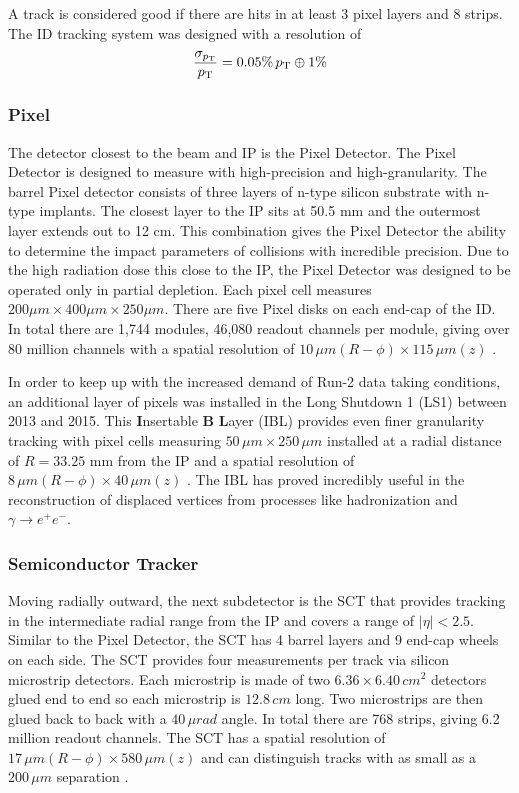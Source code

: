 		A track is considered good if there are hits in at least 3 pixel layers and 8 strips. The ID tracking system was designed with a resolution of 
		\begin{equation}\label{eqn:tracking-resolution}
		\frac{\sigma_{p_{\text{T}}}}{p_{\text{T}}} = 0.05 \% \, p_{\text{T}} \oplus 1\%
		\end{equation}
	
		\subsubsection{Pixel}\label{sssec:pixel}
		The detector closest to the beam and IP is the Pixel Detector. The Pixel Detector is designed to measure with high-precision and high-granularity. The barrel Pixel detector consists of three layers of n-type silicon substrate with n-type implants. The closest layer to the IP sits at 50.5 mm and the outermost layer extends out to 12 cm. This combination gives the Pixel Detector the ability to determine the impact parameters of collisions with incredible precision. Due to the high radiation dose this close to the IP, the Pixel Detector was designed to be operated only in partial depletion. Each pixel cell measures $200 \mu m \times 400 \mu m \times 250 \mu m$. There are five Pixel disks on each end-cap of the ID. In total there are 1,744 modules, 46,080 readout channels per module, giving over 80 million channels with a spatial resolution of $10 \, \mu m (R-\phi) \times 115 \, \mu m (z)$ \cite{ATLAS-pixel}. 

		In order to keep up with the increased demand of Run-2 data taking conditions, an additional layer of pixels was installed in the Long Shutdown 1 (LS1) between 2013 and 2015. This \textbf{I}nsertable \textbf{B} \textbf{L}ayer (IBL) provides even finer granularity tracking with pixel cells measuring $50 \, \mu m \times 250 \, \mu m$ installed at a radial distance of $R=33.25$ mm from the IP and a spatial resolution of $8 \, \mu m (R-\phi) \times 40 \, \mu m (z)$ \cite{ATLAS-IBL}. The IBL has proved incredibly useful in the reconstruction of displaced vertices from processes like \bjet hadronization and $\gamma \rightarrow e^+ e^-$.

		\subsubsection{Semiconductor Tracker}\label{sssec:SCT}
		Moving radially outward, the next subdetector is the SCT that provides tracking in the intermediate radial range from the IP and covers a range of $|\eta| < 2.5$. Similar to the Pixel Detector, the SCT has 4 barrel layers and 9 end-cap wheels on each side. The SCT provides four measurements per track via silicon microstrip detectors. Each microstrip is made of two $6.36 \times 6.40 \, cm^2$ detectors glued end to end so each microstrip is $12.8 \, cm$ long. Two microstrips are then glued back to back with a $40 \, \mu rad$ angle. In total there are 768 strips, giving 6.2 million readout channels. The SCT has a spatial resolution of $17 \, \mu m (R-\phi) \times 580 \,\mu m (z)$ and can distinguish tracks with as small as a $200 \, \mu m$ separation \cite{ATLAS-ID}.


